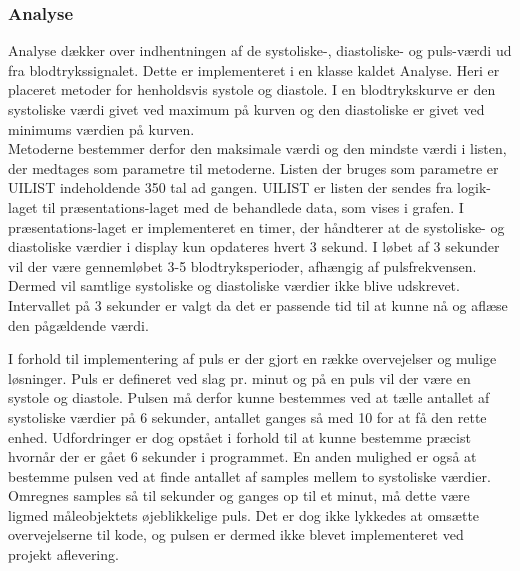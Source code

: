 \subsubsection{Analyse}
Analyse dækker over indhentningen af de systoliske-, diastoliske- og puls-værdi ud fra blodtrykssignalet. Dette er implementeret i en klasse kaldet Analyse. Heri er placeret metoder for henholdsvis systole og diastole. I en blodtrykskurve er den systoliske værdi givet ved maximum på kurven og den diastoliske er givet ved minimums værdien på kurven. \\
Metoderne bestemmer derfor den maksimale værdi og den mindste værdi i listen, der medtages som parametre til metoderne. Listen der bruges som parametre er UILIST indeholdende 350 tal ad gangen. UILIST er listen der sendes fra logik-laget til præsentations-laget med de behandlede data, som vises i grafen. I præsentations-laget er implementeret en timer, der håndterer at de systoliske- og diastoliske værdier i display kun opdateres hvert 3 sekund. I løbet af 3 sekunder vil der være gennemløbet 3-5 blodtryksperioder, afhængig af pulsfrekvensen. Dermed vil samtlige systoliske og diastoliske værdier ikke blive udskrevet. Intervallet på 3 sekunder er valgt da det er passende tid til at kunne nå og aflæse den pågældende værdi.

I forhold til implementering af puls er der gjort en række overvejelser og mulige løsninger. Puls er defineret ved slag pr. minut og på en puls vil der være en systole og diastole. Pulsen må derfor kunne bestemmes ved at tælle antallet af systoliske værdier på 6 sekunder, antallet ganges så med 10 for at få den rette enhed. Udfordringer er dog opstået i forhold til at kunne bestemme præcist hvornår der er gået 6 sekunder i programmet. En anden mulighed er også at bestemme pulsen ved at finde antallet af samples mellem to systoliske værdier. Omregnes samples så til sekunder og ganges op til et minut, må dette være ligmed måleobjektets øjeblikkelige puls. Det er dog ikke lykkedes at omsætte overvejelserne til kode, og pulsen er dermed ikke blevet implementeret ved projekt aflevering.

